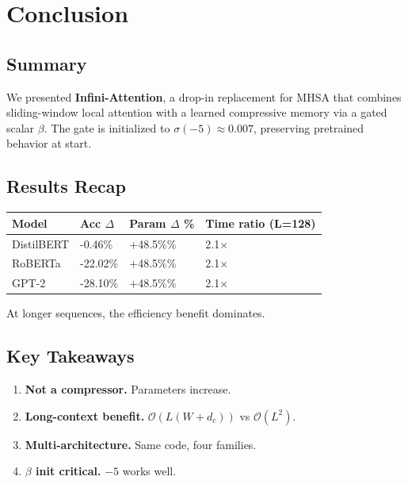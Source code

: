 \section{Conclusion}

\subsection{Summary}

We presented \textbf{Infini-Attention}, a drop-in replacement for MHSA that 
combines sliding-window local attention with a learned compressive memory 
via a gated scalar $\beta$. The gate is initialized to $\sigma(-5) \approx 0.007$, 
preserving pretrained behavior at start.

\subsection{Results Recap}

\begin{table}[H]
\centering
\small
\begin{tabular}{llll}
\toprule
\textbf{Model} & \textbf{Acc $\Delta$} & \textbf{Param $\Delta$ \%} & \textbf{Time ratio (L=128)} \\
\midrule
DistilBERT & -0.46\% & +48.5\%\% & 2.1$\times$ \\
RoBERTa & -22.02\% & +48.5\%\% & 2.1$\times$ \\
GPT-2 & -28.10\% & +48.5\%\% & 2.1$\times$ \\
\bottomrule
\end{tabular}
\end{table}

At longer sequences, the efficiency benefit dominates.

\subsection{Key Takeaways}

\begin{enumerate}
\item \textbf{Not a compressor.} Parameters increase.
\item \textbf{Long-context benefit.} $\mathcal{O}(L(W + d_c))$ vs $\mathcal{O}(L^2)$.
\item \textbf{Multi-architecture.} Same code, four families.
\item \textbf{$\beta$ init critical.} $-5$ works well.

\end{enumerate}
